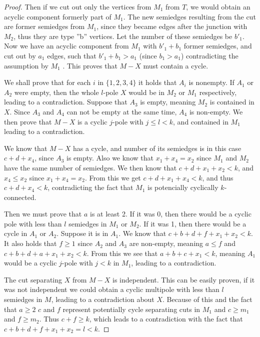 \documentclass[12pt, twoside]{book}
\begin{document}
\begin{proof}
	Then if we cut out only the vertices from $M_1$ from $T$, we would obtain an acyclic component formerly part of $M_1$. The new semiedges resulting from the cut are former semiedges from $M_1$, since they became edges after the junction with $M_2$, thus they are type ''b'' vertices. Let the number of these semiedges be $b'_1$. Now we have an acyclic component from $M_1$ with $b'_1+b_1$ former semiedges, and cut out by $a_1$ edges, such that $b'_1+b_1>a_1$ (since $b_1>a_1$) contradicting the assumption by $M_1$ . This proves that $M-X$ must contain a cycle.
	
	We shall prove that for each $i$ in $\{1,2,3,4\}$ it holds that $A_i$ is nonempty. If $A_1$ or $A_2$ were empty, then the whole $l$-pole $X$ would be in $M_2$ or $M_1$ respectively, leading to a contradiction. Suppose that $A_3$ is empty, meaning $M_2$ is contained in $X$. Since $A_3$ and $A_4$ can not be empty at the same time, $A_4$ is non-empty. We then prove that $M-X$ is a cyclic $j$-pole with $j\leq l < k$, and contained in $M_1$ leading to a contradiction. 
	
	We know that $M-X$ has a cycle, and number of its semiedges is in this case $c+d+x_4$, since $A_3$ is empty. Also we know that $x_1+x_4=x_2$ since $M_1$ and $M_2$ have the same number of semiedges. We then know that $c+d+x_1+x_2<k$, and $x_4\leq x_2$ since $x_1+x_4=x_2$. From this we get $c+d+x_1+x_4<k$, and thus $c+d+x_4<k$, contradicting the fact that $M_1$ is potencially cyclically $k$-connected.
	
	Then we must prove that $a$ is at least 2. If it was 0, then there would be a cyclic pole with less than $l$ semiedges in $M_1$ or $M_2$. If it was 1, then there would be a cycle in $A_1$ or $A_2$. Suppose it is in $A_1$. We know that $c+b+d+f+x_1+x_2<k$. It also holds that $f\geq 1$ since $A_2$ and $A_3$ are non-empty, meaning $a\leq f$ and $c+b+d+a+x_1+x_2<k$. From this we see that $a+b+c+x_1<k$, meaning $A_1$ would be a cyclic $j$-pole with $j<k$ in $M_1$, leading to a contradiction. 
	
	The cut separating $X$ from $M-X$ is independent. This can be easily proven, if it was not independent we could obtain a cyclic multipole with less than $l$ semiedges in $M$, leading to a contradiction about $X$. Because of this and the fact that $a\geq 2$ $c$ and $f$ represent potentially cycle separating cuts in $M_1$ and $c\geq m_1$ and $f\geq m_2$. Thus $c+f\geq k$, which leads to a contradiction with the fact that $c+b+d+f+x_1+x_2=l<k$.
\end{proof}
\end{document}

